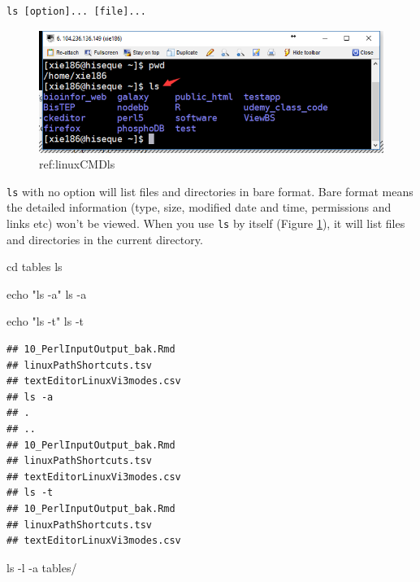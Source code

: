 \documentclass[]{book}
\makeatletter
\newenvironment{Shaded}{\begin{snugshade}}{\end{snugshade}}
\newcommand{\BuiltInTok}[1]{#1}
\newcommand{\FunctionTok}[1]{\textcolor[rgb]{0.00,0.00,0.00}{#1}}
\newcommand{\NormalTok}[1]{#1}
\newcommand{\StringTok}[1]{\textcolor[rgb]{0.31,0.60,0.02}{#1}}
\newenvironment{kframe}{%
\medskip{}
\setlength{\fboxsep}{.8em}
 \def\at@end@of@kframe{}%
 \ifinner\ifhmode%
  \def\at@end@of@kframe{\end{minipage}}%
  \begin{minipage}{\columnwidth}%
 \fi\fi%
 \def\FrameCommand##1{\hskip\@totalleftmargin \hskip-\fboxsep
 \colorbox{shadecolor}{##1}\hskip-\fboxsep
     \hskip-\linewidth \hskip-\@totalleftmargin \hskip\columnwidth}%
 \MakeFramed {\advance\hsize-\width
   \@totalleftmargin\z@ \linewidth\hsize
   \@setminipage}}%
 {\par\unskip\endMakeFramed%
 \at@end@of@kframe}
\renewenvironment{Shaded}{\begin{kframe}}{\end{kframe}}
\makeatother
\begin{document}
\begin{verbatim}
ls [option]... [file]...
\end{verbatim}



\begin{figure}

{\centering \includegraphics[width=0.8\linewidth]{figures/linuxCMDls} 

}

\caption{ref:linuxCMDls}\label{fig:linuxCMDls}
\end{figure}

\texttt{ls} with no option will list files and directories in bare format. Bare format means the detailed information (type, size, modified date and time, permissions and links etc) won't be viewed. When you use \texttt{ls} by itself (Figure \ref{fig:linuxCMDls}), it will list files and directories in the current directory.

\begin{Shaded}
\begin{Highlighting}[]
\BuiltInTok{cd}\NormalTok{ tables}
\FunctionTok{ls}

\BuiltInTok{echo} \StringTok{"ls -a"}
\FunctionTok{ls}\NormalTok{ -a }

\BuiltInTok{echo} \StringTok{"ls -t"}
\FunctionTok{ls}\NormalTok{ -t}
\end{Highlighting}
\end{Shaded}

\begin{verbatim}
## 10_PerlInputOutput_bak.Rmd
## linuxPathShortcuts.tsv
## textEditorLinuxVi3modes.csv
## ls -a
## .
## ..
## 10_PerlInputOutput_bak.Rmd
## linuxPathShortcuts.tsv
## textEditorLinuxVi3modes.csv
## ls -t
## 10_PerlInputOutput_bak.Rmd
## linuxPathShortcuts.tsv
## textEditorLinuxVi3modes.csv
\end{verbatim}

\begin{Shaded}
\begin{Highlighting}[]
\FunctionTok{ls}\NormalTok{ -l -a tables/}
\end{Highlighting}
\end{Shaded}
\end{document}
